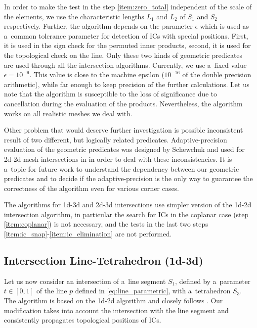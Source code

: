 In order to make the test in the step \ref{item:zero_total} independent of the  scale of the elements,
we use the characteristic lengths $L_1$ and $L_2$ of $S_1$ and $S_2$ respectively.
Further, the algorithm depends on the parameter $\epsilon$ which is used as a~common tolerance parameter for detection of ICs with special positions. First, it is used in the sign check for the permuted inner products, second, it is used for the topological check on the line.
Only these two kinds of geometric predicates are used through all the intersection algorithms. Currently, we use a~fixed value $\epsilon=10^{-9}$.
This value is close to the machine epsilon ($10^{-16}$ of the double precision 
arithmetic), while far enough to keep precision of the further calculations. Let us note that the algorithm is susceptible to the loss of significance 
due to cancellation during the evaluation of the products. Nevertheless, the algorithm works on all realistic meshes we deal with.

Other problem that would deserve further investigation is possible inconsistent result of two different, but logically related predicates. 
Adaptive-precision evaluation of the geometric predicates was designed by Schewchuk \cite{shewchuk_adaptive_1997} and used for 2d-2d mesh
intersections in \cite{elsheikh_reliable_2012} in order to deal with these inconsistencies. It is a~topic for future work to understand
the dependency between our geometric predicates and to decide if the adaptive-precision is the only way to guarantee the correctness
of the algorithm even for various corner cases.


The algorithms for 1d-3d and 2d-3d intersections use simpler version of the 1d-2d intersection algorithm,
in particular the search for ICs in the coplanar case 
(step \ref{item:coplanar}) is not necessary, and the tests in the last two steps \ref{item:ic_snap}-\ref{item:ic_elimination} are not performed.


\subsection{Intersection Line-Tetrahedron (1d-3d)}
Let us now consider an intersection of a~line segment $S_1$, defined by a~parameter $t\in [0,1]$ of the line $p$ defined in \eqref{eq:line_parametric}, with a~tetrahedron $S_3$. The algorithm is based on the 1d-2d algorithm and closely follows \cite{platis_fast_2003}. Our modification takes into account
the intersection with the line segment and consistently propagates topological positions of ICs.

